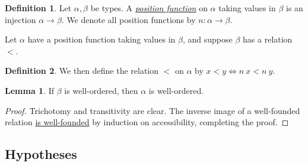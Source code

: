 \documentclass{article}
\newcommand{\corelem}[3]{\href{https://leanprover-community.github.io/mathlib4\_docs/#1.html\##2}{#3}}
\newcommand{\cdef}[3]{\href{https://leanprover-community.github.io/con-nf/doc/ConNF/#1.html\#ConNF.#2}{\emph{#3}}}
\theoremstyle{definition}
\newtheorem{definition}{Definition}[section]
\newtheorem{lemma}[theorem]{Lemma}
\theoremstyle{remark}
\begin{document}
\begin{definition}
    Let \( \alpha, \beta \) be types.
    A \cdef{Fuzz/Position}{Position}{position function} on \( \alpha \) taking values in \( \beta \) is an injection \( \alpha \to \beta \).
    We denote all position functions by \( n : \alpha \to \beta \).
\end{definition}
Let \( \alpha \) have a position function taking values in \( \beta \), and suppose \( \beta \) has a relation \( < \).
\begin{definition}
    We then define the relation \( < \) on \( \alpha \) by \( x < y \Leftrightarrow n\ x < n\ y \).
\end{definition}
\begin{lemma}
    If \( \beta \) is well-ordered, then \( \alpha \) is well-ordered.
\end{lemma}
\begin{proof}
    Trichotomy and transitivity are clear.
    The inverse image of a well-founded relation \corelem{Init/WF}{InvImage.wf}{is well-founded} by induction on accessibility, completing the proof.
\end{proof}

\subsection{Hypotheses}
\end{document}

